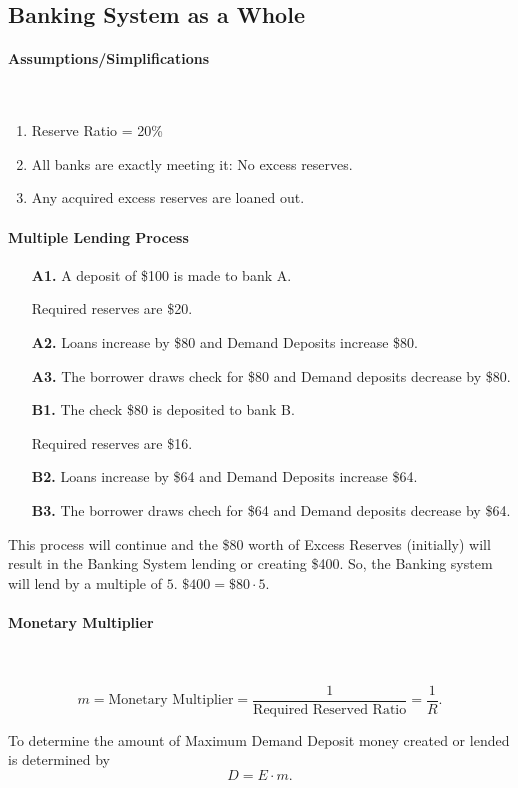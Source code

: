 
\subsection{Banking System as a Whole}

\paragraph{Assumptions/Simplifications}\

\begin{enumerate}[label = (\alph*)]
	\item Reserve Ratio = 20\%
	\item All banks are exactly meeting it: No excess reserves.
	\item Any acquired excess reserves are loaned out.
\end{enumerate}

\paragraph{Multiple Lending Process}

\begin{enumerate}
	\item[\textbf{A1.}] A deposit of \$100 is made to bank A.

		Required reserves are \$20.

	\item[\textbf{A2.}] Loans increase by \$80 and Demand Deposits increase \$80.

	\item[\textbf{A3.}] The borrower draws check for \$80 and Demand deposits decrease by \$80.
	
	\item[\textbf{B1.}] The check \$80 is deposited to bank B.

		Required reserves are \$16.

	\item[\textbf{B2.}] Loans increase by \$64 and Demand Deposits increase \$64.

	\item[\textbf{B3.}] The borrower draws chech for \$64 and Demand deposits decrease by \$64.
\end{enumerate}

This process will continue and the \$80 worth of Excess Reserves (initially) will result in the Banking System lending or creating \$400. So, the Banking system will lend by a multiple of $5$. $\$400 = \$80 \cdot 5$.

\paragraph{Monetary Multiplier}\ 

\[
	m = \text{Monetary Multiplier} = \frac{1}{\text{Required Reserved Ratio}} = \frac{1}{R}.
\]

To determine the amount of Maximum Demand Deposit money created or lended is determined by \[
	D = E \cdot m.
\]
